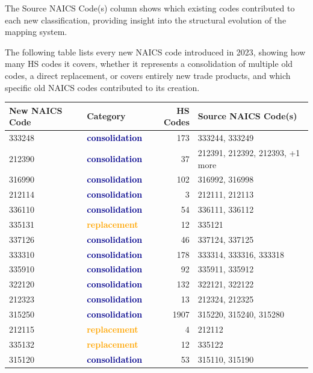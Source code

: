 \documentclass[11pt]{article}
\begin{document}
The Source NAICS Code(s) column shows which existing codes contributed to each new classification, providing insight into the structural evolution of the mapping system.

The following table lists every new NAICS code introduced in 2023, showing how many HS codes it covers, whether it represents a consolidation of multiple old codes, a direct replacement, or covers entirely new trade products, and which specific old NAICS codes contributed to its creation.

\begin{table}[H]
\centering
{}
\begin{tabular}{llrl}
\toprule
\textbf{New NAICS Code} & \textbf{Category} & \textbf{HS Codes} & \textbf{Source NAICS Code(s)} \\
\midrule
333248 & \textcolor{darkblue}{\textbf{consolidation}} & 173 & 333244, 333249 \\
212390 & \textcolor{darkblue}{\textbf{consolidation}} & 37 & 212391, 212392, 212393, +1 more \\
316990 & \textcolor{darkblue}{\textbf{consolidation}} & 102 & 316992, 316998 \\
212114 & \textcolor{darkblue}{\textbf{consolidation}} & 3 & 212111, 212113 \\
336110 & \textcolor{darkblue}{\textbf{consolidation}} & 54 & 336111, 336112 \\
335131 & \textcolor{orange}{\textbf{replacement}} & 12 & 335121 \\
337126 & \textcolor{darkblue}{\textbf{consolidation}} & 46 & 337124, 337125 \\
333310 & \textcolor{darkblue}{\textbf{consolidation}} & 178 & 333314, 333316, 333318 \\
335910 & \textcolor{darkblue}{\textbf{consolidation}} & 92 & 335911, 335912 \\
322120 & \textcolor{darkblue}{\textbf{consolidation}} & 132 & 322121, 322122 \\
212323 & \textcolor{darkblue}{\textbf{consolidation}} & 13 & 212324, 212325 \\
315250 & \textcolor{darkblue}{\textbf{consolidation}} & 1907 & 315220, 315240, 315280 \\
212115 & \textcolor{orange}{\textbf{replacement}} & 4 & 212112 \\
335132 & \textcolor{orange}{\textbf{replacement}} & 12 & 335122 \\
315120 & \textcolor{darkblue}{\textbf{consolidation}} & 53 & 315110, 315190 \\

\end{tabular}
\end{table}
\end{document}
